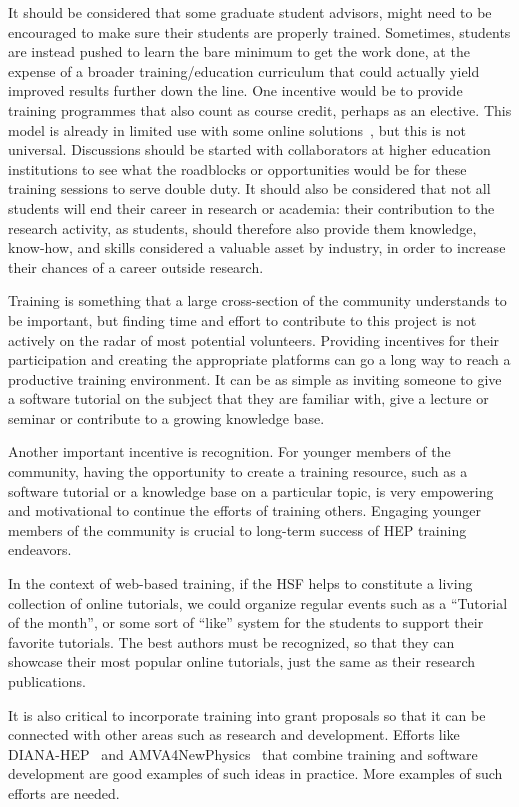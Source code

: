 \documentclass[12pt,a4paper]{article}
\begin{document}
It should be considered that some graduate student
advisors, might need to be encouraged to make sure their students are properly
trained. Sometimes, students are instead pushed to learn the bare minimum to get
the work done, at the expense of a broader training/education curriculum that
could actually yield improved results further down the line. One incentive
would be to provide training programmes that also count as course credit, perhaps
as an elective. This model is already in limited use with some online
solutions~\cite{TrainingProgram}, but this is not universal.
Discussions should be started with collaborators at higher education
institutions to see what the roadblocks or opportunities would be for these
training sessions to serve double duty.
It should also be considered that not all students will end their career in
research or academia: their contribution to the research activity, as students,
should therefore also provide them knowledge, know-how, and skills considered a
valuable asset by industry, in order to increase their chances of a career
outside research.

Training is something that a large cross-section of the community
understands to be important, but finding time and effort to contribute to this
project is not actively on the radar of most potential volunteers. Providing
incentives for their participation and creating the appropriate platforms can go
a long way to reach a productive training environment. It can be as simple as
inviting someone to give a software tutorial on the subject that they are
familiar with, give a lecture or seminar or contribute to a growing knowledge
base.

Another important incentive is recognition. For younger members of the
community, having the opportunity to create a training resource, such as a
software tutorial or a knowledge base on a particular topic, is very empowering
and motivational to continue the efforts of training others. Engaging younger
members of the community is crucial to long-term success of HEP training
endeavors.

In the context of web-based training, if the HSF helps to constitute a living
collection of online tutorials, we could organize regular events such as
a ``Tutorial of the month'', or some sort of ``like'' system for the students
to support their favorite tutorials. The best authors must be recognized, so
that they can showcase their most popular online tutorials, just the same as
their research publications.

It is also critical to incorporate training into grant proposals so that it can
be connected with other areas such as research and development. Efforts like
DIANA-HEP~\cite{DIANA-HEP} and AMVA4NewPhysics~\cite{AMVA4NewPhysics}
that combine training
and software development are good examples of such ideas in practice. More
examples of such efforts are needed.
\end{document}
